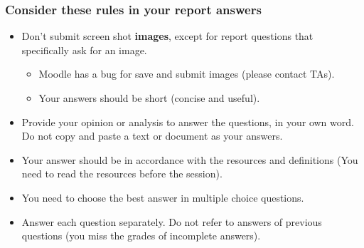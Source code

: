 \documentclass[aspectratio=169,15pt]{beamer}
\begin{document}
\begin{frame}
    \frametitle{Consider these rules in your report answers}

    \begin{itemize}
        \item Don’t submit screen shot \textbf{images}, except for report questions that specifically ask for an image.
              \begin{itemize}
                  \item Moodle has a bug for save and submit images (please contact TAs).
                  \item Your answers should be short (concise and useful).
              \end{itemize}
        \item Provide your opinion or analysis to answer the questions, in your own word. Do not copy and paste a text or document as your answers.
        \item Your answer should be in accordance with the resources and definitions (You need to read the resources before the session).
        \item You need to choose the best answer in multiple choice questions.
        \item Answer each question separately. Do not refer to answers of previous questions  (you miss the grades of incomplete answers).
    \end{itemize}

\end{frame}
\end{document}

